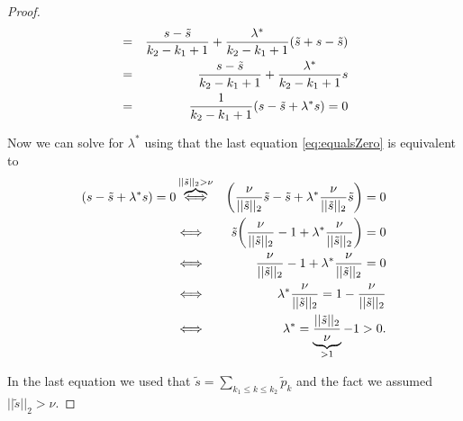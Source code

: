 \begin{proof}
\begin{eqnarray}
                    &=& \frac{s - \tilde{s}}{k_{2} - k_{1} + 1} + \frac{\lambda^{\ast}}{k_{2} - k_{1} + 1} (\tilde{s} + s - \tilde{s}) \notag \\
                    &=& \frac{s - \tilde{s}}{k_{2} - k_{1} + 1} + \frac{\lambda^{\ast}}{k_{2} - k_{1} + 1}s \notag \\
                    &=& \frac{1}{k_{2} - k_{1} + 1} (s - \tilde{s} + \lambda^{\ast}s) = 0 \label{eq:equalsZero}
                \end{eqnarray}

            Now we can solve for $\lambda^{\ast}$ using that the last equation \ref{eq:equalsZero} is equivalent to
                \begin{eqnarray}
                    (s - \tilde{s} + \lambda^{\ast} s) = 0 &\overbrace{\Longleftrightarrow}^{||\tilde{s}||_{2} > \nu}& \bigg(\frac{\nu}{||\tilde{s}||_{2}}\tilde{s} - \tilde{s} + \lambda^{\ast} \frac{\nu}{||\tilde{s}||_{2}}\tilde{s} \bigg) = 0 \notag \\
                    &\Longleftrightarrow& \tilde{s} \bigg( \frac{\nu}{||\tilde{s}||_{2}} - 1 + \lambda^{\ast} \frac{\nu}{||\tilde{s}||_{2}} \bigg) = 0 \notag \\
                    &\Longleftrightarrow& \frac{\nu}{||\tilde{s}||_{2}} - 1 + \lambda^{\ast} \frac{\nu}{||\tilde{s}||_{2}} = 0 \notag \\
                    &\Longleftrightarrow& \lambda^{\ast} \frac{\nu}{||\tilde{s}||_{2}} = 1 - \frac{\nu}{||\tilde{s}||_{2}} \notag \\
                    &\Longleftrightarrow& \lambda^{\ast} = \underbrace{\frac{||\tilde{s}||_{2}}{\nu}}_{> 1} - 1 > 0. \notag
                \end{eqnarray}

            In the last equation we used that $\tilde{s} = \sum\limits_{k_{1} \le k \le k_{2}} \tilde{p}_{k}$ and the fact we assumed $||\tilde{s}||_{2} > \nu$.





\end{proof}
